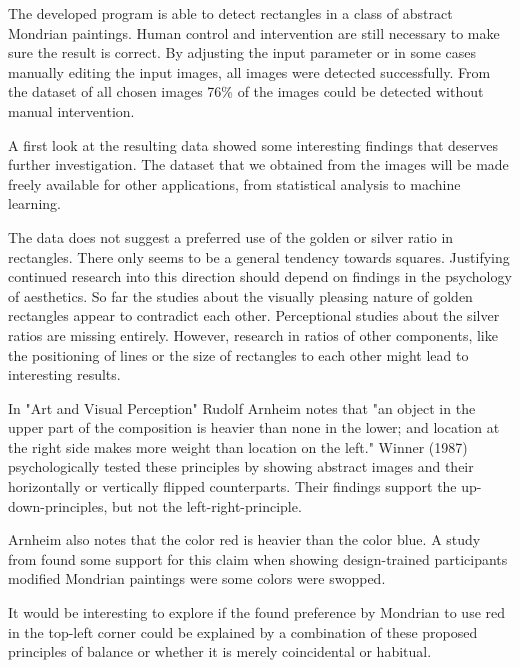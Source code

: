 \documentclass[serif,article,noparskip]{agse-thesis}
\begin{document}
The developed program is able to detect rectangles in a class of abstract
Mondrian paintings. Human control and intervention are still necessary to make
sure the result is correct. By adjusting the input parameter or in some cases
manually editing the input images, all images were detected successfully. From
the dataset of all chosen images 76\% of the images could be detected without
manual intervention.

A first look at the resulting data showed some interesting findings that deserves
further investigation. The dataset that we obtained from the images will be made
freely available for other applications, from statistical analysis to machine
learning.

The data does not suggest a preferred use of the golden or silver ratio in
rectangles. There only seems to be a general tendency towards squares.
Justifying continued research into this direction should depend on findings in
the psychology of aesthetics. So far the studies about the visually pleasing
nature of golden rectangles appear to contradict each other. Perceptional
studies about the silver ratios are missing entirely. However, research in  ratios
of other components, like the positioning of lines or the size of rectangles to
each other might lead to interesting results.

In "Art and Visual Perception" Rudolf Arnheim \cite{Arnheim1965} notes that "an
object in the upper part of the composition is heavier than none in the lower;
and location at the right side makes more weight than location on the left."
Winner (1987) \cite{Winner1987} psychologically tested these principles by
showing abstract images and their horizontally or vertically flipped
counterparts. Their findings support the up-down-principles, but not the
left-right-principle.

Arnheim also notes that the color red is heavier than the color blue. A study
from \cite{Locher2005} found some support for this claim when showing
design-trained participants modified Mondrian paintings were some colors were
swopped.

It would be interesting to explore if the found preference by Mondrian to use
red in the top-left corner could be explained by a combination of these proposed
principles of balance or whether it is merely coincidental or habitual.








% 
\end{document}
